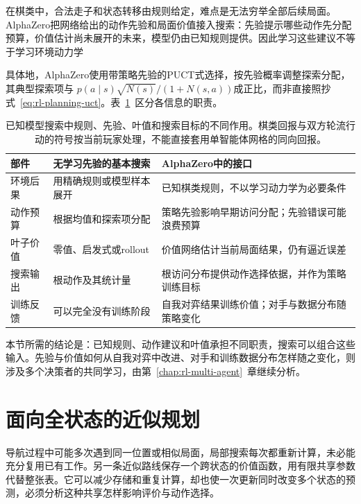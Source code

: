 在棋类中，合法走子和状态转移由规则给定，难点是无法穷举全部后续局面。AlphaZero把网络给出的动作先验和局面价值接入搜索：先验提示哪些动作先分配预算，价值估计尚未展开的未来，模型仍由已知规则提供。因此学习这些建议不等于学习环境动力学

具体地，AlphaZero使用带策略先验的PUCT式选择，按先验概率调整探索分配，其典型探索项与
$p(a\mid s)\sqrt{N(s)}/(1+N(s,a))$成正比，而非直接照抄式~\eqref{eq:rl-planning-uct}。表~\ref{tab:rl-planning-alphazero}~区分各信息的职责。

\begin{table}[t]
 \centering
 \small
 \begin{tabularx}{\linewidth}{@{}l>{\raggedright\arraybackslash}X>{\raggedright\arraybackslash}X@{}}
  \toprule
  部件 & 无学习先验的基本搜索 & AlphaZero中的接口\\
  \midrule
  环境后果 & 用精确规则或模型样本展开 & 已知棋类规则，不以学习动力学为必要条件\\
  动作预算 & 根据均值和探索项分配 & 策略先验影响早期访问分配；先验错误可能浪费预算\\
  叶子价值 & 零值、启发式或rollout & 价值网络估计当前局面结果，仍有逼近误差\\
  搜索输出 & 根动作及其统计量 & 根访问分布提供动作选择依据，并作为策略训练目标\\
  训练反馈 & 可以完全没有训练阶段 & 自我对弈结果训练价值；对手与数据分布随策略变化\\
  \bottomrule
 \end{tabularx}
 \caption{已知模型搜索中规则、先验、叶值和搜索目标的不同作用。棋类回报与双方轮流行动的符号按当前玩家处理，不能直接套用单智能体网格的同向回报。}
 \label{tab:rl-planning-alphazero}
\end{table}

本节所需的结论是：已知规则、动作建议和叶值承担不同职责，搜索可以组合这些输入。先验与价值如何从自我对弈中改进、对手和训练数据分布怎样随之变化，则涉及多个决策者的共同学习，由第~\ref{chap:rl-multi-agent}~章继续分析。

\section{面向全状态的近似规划}
\label{sec:rl-planning-global-approximation}

导航过程中可能多次遇到同一位置或相似局面，局部搜索每次都重新计算，未必能充分复用已有工作。另一条近似路线保存一个跨状态的价值函数，用有限共享参数代替整张表。它可以减少存储和重复计算，却也使一次更新同时改变多个状态的预测，必须分析这种共享怎样影响评价与动作选择。


